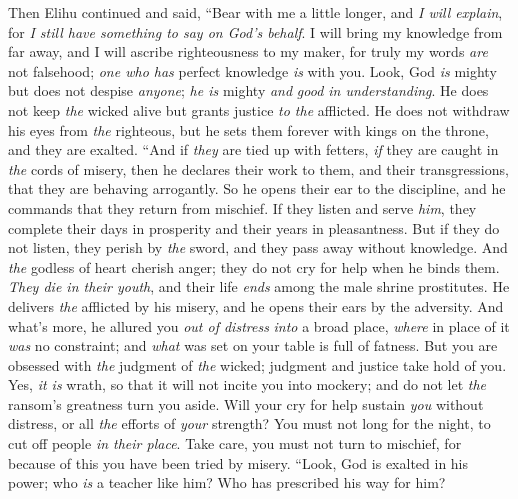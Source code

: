 \begin{biblechapter} %
 Then Elihu continued and said,
\verse “Bear with me a little longer, and \textit{I will explain}, 
for \textit{I still have something to say on God’s behalf}.
\verse I will bring my knowledge from far away, 
and I will ascribe righteousness to my maker,
\verse for truly my words \textit{are} not falsehood; 
\textit{one who has} perfect knowledge \textit{is} with you.
\verse Look, God \textit{is} mighty but does not despise \textit{anyone}; 
\textit{he is} mighty \textit{and} \textit{good in understanding}.
\verse He does not keep \textit{the} wicked alive 
but grants justice \textit{to the} afflicted.
\verse He does not withdraw his eyes from \textit{the} righteous, 
but he sets them forever with kings on the throne, and they are exalted.
\verse “And if \textit{they} are tied up with fetters, 
\textit{if} they are caught in \textit{the} cords of misery,
\verse then he declares their work to them, 
and their transgressions, that they are behaving arrogantly.
\verse So he opens their ear to the discipline, 
and he commands that they return from mischief.
\verse If they listen and serve \textit{him}, 
they complete their days in prosperity and their years in pleasantness.
\verse But if they do not listen, they perish by \textit{the} sword, 
and they pass away without knowledge.
\verse And \textit{the} godless of heart cherish anger; 
they do not cry for help when he binds them.
\verse \textit{They die in their youth}, 
and their life \textit{ends} among the male shrine prostitutes.
\verse He delivers \textit{the} afflicted by his misery, 
and he opens their ears by the adversity.
\verse And what’s more, he allured you \textit{out of distress} 
\textit{into} a broad place, \textit{where} in place of it \textit{was} no constraint; 
and \textit{what} was set on your table is full of fatness.
\verse But you are obsessed with \textit{the} judgment of \textit{the} wicked; 
judgment and justice take hold of you.
\verse Yes, \textit{it is} wrath, so that it will not incite you into mockery; 
and do not let \textit{the} ransom’s greatness turn you aside.
\verse Will your cry for help sustain \textit{you} without distress, 
or all \textit{the} efforts of \textit{your} strength?
\verse You must not long for the night, 
to cut off people \textit{in their place}.
\verse Take care, you must not turn to mischief, 
for because of this you have been tried by misery.
\verse “Look, God is exalted in his power; 
who \textit{is} a teacher like him?
\verse Who has prescribed his way for him? 

\end{biblechapter}
